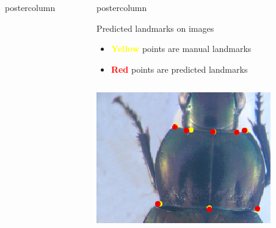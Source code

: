 \begin{frame}
\begin{columns}
\begin{column}{.49\textwidth}
\begin{beamercolorbox}[center,wd=\textwidth]{postercolumn}
\begin{minipage}[T]{.95\textwidth}
{          }
        \end{minipage}
      \end{beamercolorbox}
    \end{column}
    \begin{column}{.49\textwidth}
      \begin{beamercolorbox}[center,wd=\textwidth]{postercolumn}
        \begin{minipage}[T]{.95\textwidth}
          \parbox[t][\columnheight]{\textwidth}{
            
            \begin{block}{Predicted landmarks on images}
            	\begin{itemize}
            		\item \textbf{\textcolor{yellow}{Yellow}} points are manual landmarks
            		\item \textbf{\textcolor{red}{Red}} points are predicted landmarks
            	\end{itemize}
            	\begin{columns}
            		\begin{column}{.45\textwidth}
            			\centering
            			\includegraphics[width=.97\textwidth]{images/Prono_115.eps}
            		\end{column}
            		\begin{column}{.45\textwidth}
            			\centering

\end{column}
\end{columns}
\end{block}}
\end{minipage}
\end{beamercolorbox}
\end{column}
\end{columns}
\end{frame}

